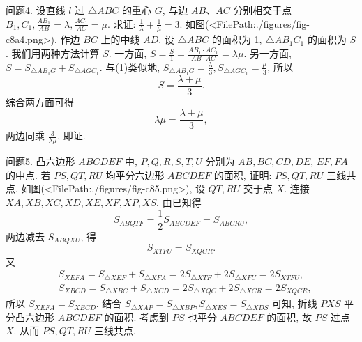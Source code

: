 问题4. 设直线 $l$ 过 $\triangle A B C$ 的重心 $G$, 与边 $A B 、 A C$ 分别相交于点 $B_1, C_1, \frac{A B_1}{A B}=\lambda, \frac{A C_1}{A C}=\mu$. 求证: $\frac{1}{\lambda}+\frac{1}{\mu}=3$.
如图(<FilePath:./figures/fig-c8a4.png>), 作边 $B C$ 上的中线 $A D$. 设 $\triangle A B C$ 的面积为 1, $\triangle A B_1 C_1$ 的面积为 $S$. 我们用两种方法计算 $S$.
一方面, $S=\frac{S}{1}=\frac{A B_1 \cdot A C_1}{A B \cdot A C}=\lambda \mu$.
另一方面, $S=S_{\triangle A B_1 G}+S_{\triangle A G C_1}$.
与(1)类似地, $S_{\triangle A B_1 G}=\frac{\lambda}{3}, S_{\triangle A G C_1}=\frac{\mu}{3}$,
所以
$$
S=\frac{\lambda+\mu}{3} .
$$
综合两方面可得
$$
\lambda \mu=\frac{\lambda+\mu}{3},
$$
两边同乘 $\frac{3}{\lambda \mu}$, 即证.



问题5. 凸六边形 $A B C D E F$ 中, $P, Q, R, S, T, U$ 分别为 $A B, B C, C D, D E$, $E F, F A$ 的中点.
若 $P S, Q T, R U$ 均平分六边形 $A B C D E F$ 的面积, 证明: $P S, Q T, R U$ 三线共点.
如图(<FilePath:./figures/fig-c85.png>), 设 $Q T, R U$ 交于点 $X$. 连接 $X A, X B, X C, X D, X E, X F, X P, X S$. 由已知得
$$
S_{A B Q T F}=\frac{1}{2} S_{A B C D E F}=S_{A B C R U},
$$
两边减去 $S_{A B Q X U}$, 得
$$
S_{X T F U}=S_{X Q C R} .
$$
又
$$
\begin{aligned}
& S_{X E F A}=S_{\triangle X E F}+S_{\triangle X F A}=2 S_{\triangle X T F}+2 S_{\triangle X F U}=2 S_{X T F U}, \\
& S_{X B C D}=S_{\triangle X B C}+S_{\triangle X C D}=2 S_{\triangle X Q C}+2 S_{\triangle X C R}=2 S_{X Q C R},
\end{aligned}
$$
所以 $S_{X E F A}=S_{X B C D}$. 结合 $S_{\triangle X A P}=S_{\triangle X B P}, S_{\triangle X E S}=S_{\triangle X D S}$ 可知, 折线 $P X S$ 平分凸六边形 $A B C D E F$ 的面积.
考虑到 $P S$ 也平分 $A B C D E F$ 的面积, 故 $P S$ 过点 $X$.
从而 $P S, Q T, R U$ 三线共点.




